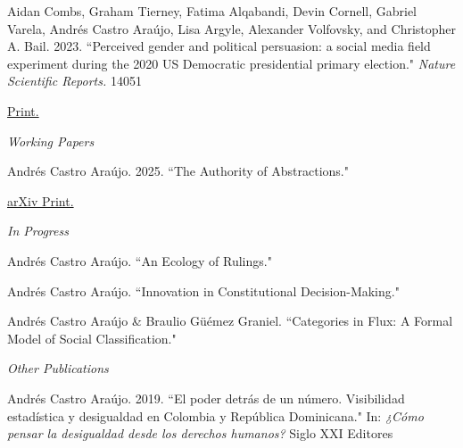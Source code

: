\documentclass[11pt,article,oneside]{memoir}
\begin{document}

\ind \normalsize Aidan Combs, Graham Tierney, Fatima Alqabandi, Devin Cornell, Gabriel Varela, \colorbox{Gray!15}{Andrés Castro Araújo}, Lisa Argyle, Alexander Volfovsky, and Christopher A. Bail. 2023. ``Perceived gender and political persuasion: a social media field experiment during the 2020 US Democratic presidential primary election." 
\emph{Nature Scientific Reports.} 14051 \par
\ind \hspace{0.35in} \footnotesize \href{https://doi.org/10.1038/s41598-023-39359-0}{Print.} \vspace{0.05in}

\bigskip

\ind \normalsize \emph{Working Papers}\par \vspace{0.075in}


\ind \normalsize \colorbox{Gray!15}{Andrés Castro Araújo}. 2025. ``The Authority of Abstractions." \par
\ind \hspace{0.35in} \footnotesize \href{https://osf.io/preprints/osf/ysa7g}{arXiv Print.} \vspace{0.05in}

\bigskip

\ind \normalsize \emph{In Progress}\par \vspace{0.075in}


\ind \normalsize \colorbox{Gray!15}{Andrés Castro Araújo}. ``An Ecology of Rulings." \medskip


\ind \normalsize \colorbox{Gray!15}{Andrés Castro Araújo}. ``Innovation in Constitutional Decision-Making." \medskip


\ind \normalsize \colorbox{Gray!15}{Andrés Castro Araújo} \& Braulio Güémez Graniel. ``Categories in Flux: A Formal Model of Social Classification." \medskip

\bigskip

\ind \normalsize \emph{Other Publications}\par \vspace{0.075in}


\ind \normalsize \colorbox{Gray!15}{Andrés Castro Araújo}. 2019. ``El poder detrás de un número. Visibilidad estadística y desigualdad en Colombia y República Dominicana." In: \emph{¿Cómo pensar la desigualdad desde los derechos humanos?} Siglo XXI Editores \par
\end{document}
